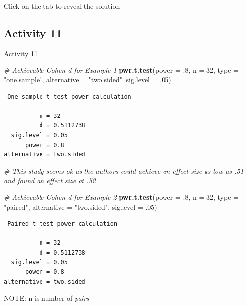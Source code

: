 \documentclass[]{book}
\newenvironment{Shaded}{\begin{snugshade}}{\end{snugshade}}
\newcommand{\CommentTok}[1]{\textcolor[rgb]{0.56,0.35,0.01}{\textit{#1}}}
\newcommand{\DataTypeTok}[1]{\textcolor[rgb]{0.13,0.29,0.53}{#1}}
\newcommand{\DecValTok}[1]{\textcolor[rgb]{0.00,0.00,0.81}{#1}}
\newcommand{\FloatTok}[1]{\textcolor[rgb]{0.00,0.00,0.81}{#1}}
\newcommand{\KeywordTok}[1]{\textcolor[rgb]{0.13,0.29,0.53}{\textbf{#1}}}
\newcommand{\NormalTok}[1]{#1}
\newcommand{\StringTok}[1]{\textcolor[rgb]{0.31,0.60,0.02}{#1}}
\begin{document}
Click on the tab to reveal the solution

\hypertarget{activity-11}{%
\subsection{Activity 11}\label{activity-11}}

Activity 11

\begin{Shaded}
\begin{Highlighting}[]
\CommentTok{# Achievable Cohen d for Example 1}
\KeywordTok{pwr.t.test}\NormalTok{(}\DataTypeTok{power =} \FloatTok{.8}\NormalTok{, }
           \DataTypeTok{n =} \DecValTok{32}\NormalTok{, }
           \DataTypeTok{type =} \StringTok{"one.sample"}\NormalTok{, }
           \DataTypeTok{alternative =} \StringTok{"two.sided"}\NormalTok{, }
           \DataTypeTok{sig.level =} \FloatTok{.05}\NormalTok{)}
\end{Highlighting}
\end{Shaded}

\begin{verbatim}
 One-sample t test power calculation 

          n = 32
          d = 0.5112738
  sig.level = 0.05
      power = 0.8
alternative = two.sided
\end{verbatim}

\begin{Shaded}
\begin{Highlighting}[]
\CommentTok{# This study seems ok as the authors could achieve an effect size as low as .51 and found an effect size at .52}

\CommentTok{# Achievable Cohen d for Example 2}
\KeywordTok{pwr.t.test}\NormalTok{(}\DataTypeTok{power =} \FloatTok{.8}\NormalTok{, }
           \DataTypeTok{n =} \DecValTok{32}\NormalTok{, }
           \DataTypeTok{type =} \StringTok{"paired"}\NormalTok{, }
           \DataTypeTok{alternative =} \StringTok{"two.sided"}\NormalTok{, }
           \DataTypeTok{sig.level =} \FloatTok{.05}\NormalTok{) }
\end{Highlighting}
\end{Shaded}

\begin{verbatim}
 Paired t test power calculation 

          n = 32
          d = 0.5112738
  sig.level = 0.05
      power = 0.8
alternative = two.sided
\end{verbatim}

NOTE: n is number of \emph{pairs}
\end{document}
